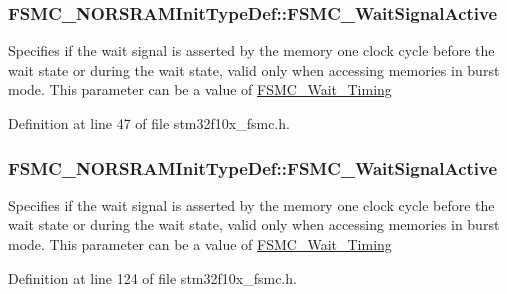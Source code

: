 \subsubsection[{\texorpdfstring{F\+S\+M\+C\+\_\+\+Wait\+Signal\+Active}{FSMC_WaitSignalActive}}]{ F\+S\+M\+C\+\_\+\+N\+O\+R\+S\+R\+A\+M\+Init\+Type\+Def\+::\+F\+S\+M\+C\+\_\+\+Wait\+Signal\+Active}\hypertarget{struct_f_s_m_c___n_o_r_s_r_a_m_init_type_def_a8f43f9f6a5d0a3c6cf231e69f35ef3d4}{}\label{struct_f_s_m_c___n_o_r_s_r_a_m_init_type_def_a8f43f9f6a5d0a3c6cf231e69f35ef3d4}
Specifies if the wait signal is asserted by the memory one clock cycle before the wait state or during the wait state, valid only when accessing memories in burst mode. This parameter can be a value of \hyperlink{group___f_s_m_c___wait___timing}{F\+S\+M\+C\+\_\+\+Wait\+\_\+\+Timing} 

Definition at line 47 of file stm32f10x\+\_\+fsmc.\+h.

\subsubsection[{\texorpdfstring{F\+S\+M\+C\+\_\+\+Wait\+Signal\+Active}{FSMC_WaitSignalActive}}]{ F\+S\+M\+C\+\_\+\+N\+O\+R\+S\+R\+A\+M\+Init\+Type\+Def\+::\+F\+S\+M\+C\+\_\+\+Wait\+Signal\+Active}\hypertarget{struct_f_s_m_c___n_o_r_s_r_a_m_init_type_def_a71c6e7cc8e7e1a8fd0562960ffd23e88}{}\label{struct_f_s_m_c___n_o_r_s_r_a_m_init_type_def_a71c6e7cc8e7e1a8fd0562960ffd23e88}
Specifies if the wait signal is asserted by the memory one clock cycle before the wait state or during the wait state, valid only when accessing memories in burst mode. This parameter can be a value of \hyperlink{group___f_s_m_c___wait___timing}{F\+S\+M\+C\+\_\+\+Wait\+\_\+\+Timing} 

Definition at line 124 of file stm32f10x\+\_\+fsmc.\+h.

